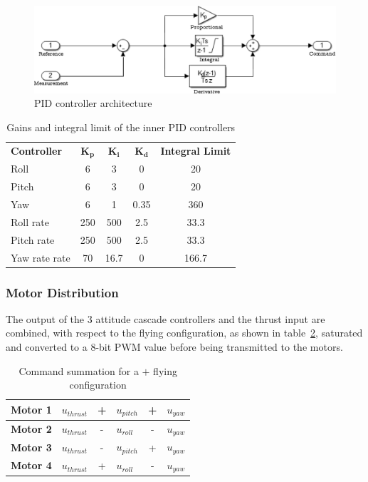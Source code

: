 \documentclass[a4paper, 12pt]{report}
\begin{document}
\begin{figure}[htbp]
\centering
\includegraphics[scale = 0.8]{Images/controllerPID}
\caption{PID controller architecture}
\label{fig:controllerPID}
\end{figure}

\begin{table}[htdp]
\caption{Gains and integral limit of the inner PID controllers}
\centering
\begin{tabular}{|l||c|c|c|c|}
\hline
\textbf{Controller} & $\boldsymbol{K_p}$ & $\boldsymbol{K_i}$ & $\boldsymbol{K_d}$ & \textbf{Integral Limit}  \\
\hhline{|=#=|=|=|=|}
Roll & 6 & 3 & 0 & 20  \\
\hline
Pitch & 6 & 3 & 0 & 20  \\
\hline
Yaw & 6 & 1 & 0.35 & 360  \\
\hline
Roll rate & 250 & 500 & 2.5 & 33.3  \\
\hline
Pitch rate & 250 & 500 & 2.5 & 33.3  \\
\hline
Yaw rate rate & 70 & 16.7 & 0 & 166.7  \\
\hline
\end{tabular}
\label{tab:controllerInnerGains}
\end{table}

\subsubsection{Motor Distribution}
The output of the 3 attitude cascade controllers and the thrust input are combined, with respect to the flying configuration, as shown in table~\ref{tab:motorDistribution}, saturated and converted to a 8-bit PWM value before being transmitted to the motors. 

\begin{table}[htdp]
\caption{Command summation for a $+$  flying configuration}
\centering
\begin{tabular}{|l|l c l c l|}
\hline
\textbf{Motor 1} & $u_{thrust}$ & + &$u_{pitch}$ & + & $u_{yaw}$\\
\hline
\hline
\textbf{Motor 2} & $u_{thrust}$ & - & $u_{roll}$ & - & $u_{yaw}$ \\
\hline
\hline
\textbf{Motor 3} & $u_{thrust}$ & - & $u_{pitch}$ & + & $u_{yaw}$\\
\hline
\hline
\textbf{Motor 4} & $u_{thrust}$ & + & $u_{roll}$ & - & $u_{yaw}$ \\
\hline
\end{tabular}
\label{tab:motorDistribution}
\end{table}
\end{document}
